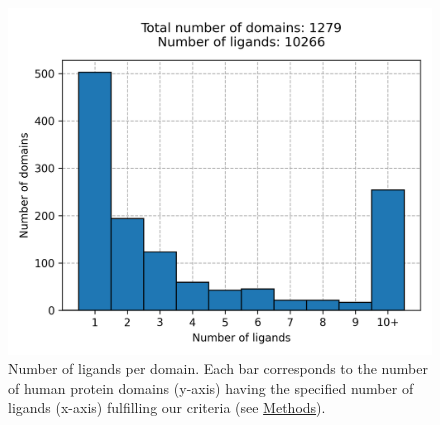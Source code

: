 \begin{figure}[htbp]
  \centering
  \includegraphics[width=0.5\linewidth]{figures/PocketVec/Supplementary/FigS16.png}
  \caption{
  Number of ligands per domain. Each bar corresponds to the number of human protein domains (y-axis) having the specified number of ligands (x-axis) fulfilling our criteria (see \hyperref[PocketVec_Methods]{Methods}).   
  }
  \label{PocketVec_FigS16}
\end{figure}


